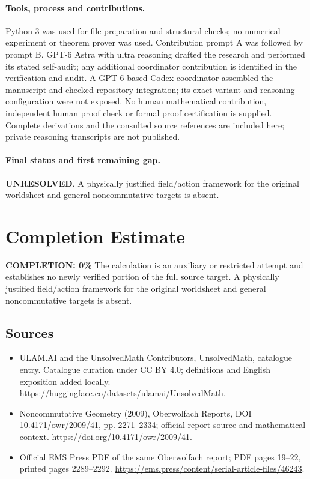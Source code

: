 \documentclass[11pt]{article}
\begin{document}
\paragraph{Tools, process and contributions.}
Python 3 was used for file preparation and structural checks; no numerical experiment or theorem prover was used. Contribution prompt A was followed by prompt B. GPT-6 Astra with ultra reasoning drafted the research and performed its stated self-audit; any additional coordinator contribution is identified in the verification and audit. A GPT-6-based Codex coordinator assembled the manuscript and checked repository integration; its exact variant and reasoning configuration were not exposed. No human mathematical contribution, independent human proof check or formal proof certification is supplied. Complete derivations and the consulted source references are included here; private reasoning transcripts are not published.

\paragraph{Final status and first remaining gap.}
\textbf{UNRESOLVED}. A physically justified field/action framework for the original worldsheet and general noncommutative targets is absent.

\section{Completion Estimate}
\noindent\textbf{COMPLETION: 0\%}
The calculation is an auxiliary or restricted attempt and establishes no newly verified portion of the full source target. A physically justified field/action framework for the original worldsheet and general noncommutative targets is absent.

\subsection{Sources}
\begin{itemize}
\item[\hypertarget{source:statement:1}{S1}] ULAM.AI and the UnsolvedMath Contributors, UnsolvedMath, catalogue entry. Catalogue curation under CC BY 4.0; definitions and English exposition added locally.
\url{https://huggingface.co/datasets/ulamai/UnsolvedMath}.
\item[\hypertarget{source:statement:2}{S2}] Noncommutative Geometry (2009), Oberwolfach Reports, DOI 10.4171/owr/2009/41, pp. 2271--2334; official report source and mathematical context.
\url{https://doi.org/10.4171/owr/2009/41}.
\item[\hypertarget{source:statement:3}{S3}] Official EMS Press PDF of the same Oberwolfach report; PDF pages 19--22, printed pages 2289--2292.
\url{https://ems.press/content/serial-article-files/46243}.
\end{itemize}
\label{end:statement}
\end{document}
